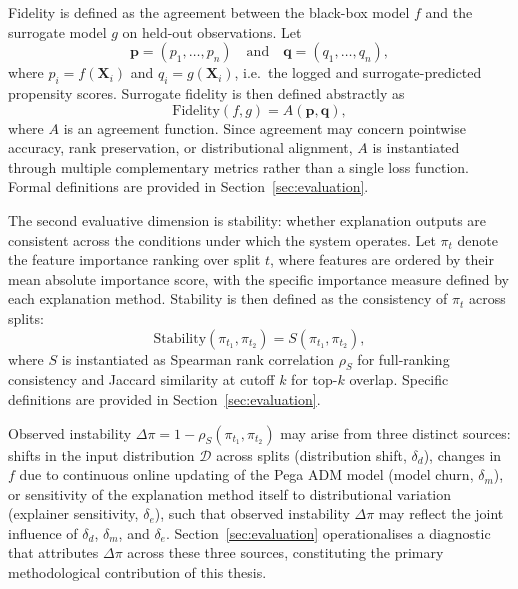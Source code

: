 \documentclass[oneside]{memoir} %
\begin{document}
Fidelity is defined as the agreement between the black-box model $f$ and the surrogate model $g$ on held-out observations. Let
\[
\mathbf{p} = (p_1, \ldots, p_n)
\quad \text{and} \quad
\mathbf{q} = (q_1, \ldots, q_n),
\]
where $p_i = f(\mathbf{X}_i)$ and $q_i = g(\mathbf{X}_i)$, i.e.\ the logged and surrogate-predicted propensity scores. Surrogate fidelity is then defined abstractly as
\[
\text{Fidelity}(f,g) = A(\mathbf{p}, \mathbf{q}),
\]
where $A$ is an agreement function. Since agreement may concern pointwise accuracy, rank preservation, or distributional alignment, $A$ is instantiated through multiple complementary metrics rather than a single loss function. Formal definitions are provided in Section~\ref{sec:evaluation}.

The second evaluative dimension is stability: whether explanation outputs are consistent across the conditions under which the system operates. Let $\pi_t$ denote the feature importance ranking over split $t$, where features are ordered by their mean absolute importance score, with the specific importance measure defined by each explanation method. Stability is then defined as the consistency of $\pi_t$ across splits:
\[
\text{Stability}(\pi_{t_1}, \pi_{t_2}) = S(\pi_{t_1}, \pi_{t_2}),
\]
where $S$ is instantiated as Spearman rank correlation $\rho_S$ for full-ranking consistency and Jaccard similarity at cutoff $k$ for top-$k$ overlap. Specific definitions are provided in Section~\ref{sec:evaluation}.

Observed instability $\Delta\pi = 1 - \rho_S(\pi_{t_1}, \pi_{t_2})$ may arise from three distinct sources: shifts in the input distribution $\mathcal{D}$ across splits (distribution shift, $\delta_d$), changes in $f$ due to continuous online updating of the Pega ADM model (model churn, $\delta_m$), or sensitivity of the explanation method itself to distributional variation (explainer sensitivity, $\delta_e$), such that observed instability $\Delta\pi$ may reflect the joint influence of $\delta_d$, $\delta_m$, and $\delta_e$. Section~\ref{sec:evaluation} operationalises a diagnostic that attributes $\Delta\pi$ across these three sources, constituting the primary methodological contribution of this thesis.
\end{document}
